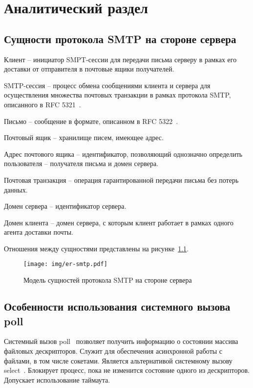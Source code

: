\chapter{Аналитический раздел}
\label{cha:analysis}

\section{Сущности протокола SMTP на стороне сервера}

Клиент -- инициатор SMPT-сессии для передачи письма серверу в рамках его доставки от отправителя в почтовые ящики получателей.

SMTP-сессия -- процесс обмена сообщениями клиента и сервера для осуществления множества почтовых транзакции в рамках протокола SMTP, описанного в RFC 5321~\cite{RFC-5321}.

Письмо -- сообщение в формате, описанном в RFC 5322~\cite{RFC-5322}.

Почтовый ящик -- хранилище писем, имеющее адрес.

Адрес почтового ящика -- идентификатор, позволяющий однозначно определить пользователя -- получателя письма и домен сервера.

Почтовая транзакция -- операция гарантированной передачи письма без потерь данных.

Домен сервера -- идентификатор сервера.

Домен клиента -- домен сервера, с которым клиент работает в рамках одного агента доставки почты.

Отношения между сущностями представлены на рисунке~\ref{fig:er-smtp}.

\begin{figure}[ht!]
	\centering
	\texttt{[image: img/er-smtp.pdf]}
	\caption{Модель сущностей протокола SMTP на стороне сервера}
	\label{fig:er-smtp}
\end{figure}

\section{Особенности использования системного вызова poll}

Системный вызов poll~\cite{poll} позволяет получить информацию о состоянии массива файловых дескрипторов.
Служит для обеспечения асинхронной работы с файлами, в том числе сокетами.
Является альтернативой системному вызову select~\cite{select}.
Блокирует процесс, пока не изменится состояние одного из дескрипторов.
Допускает использование таймаута.

